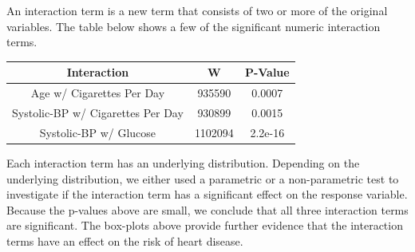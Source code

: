 \documentclass[10pt]{article}
\begin{document}
An interaction term is a new term that consists of two or more of the original variables. The table below shows a few of the significant numeric interaction terms.

\begin{table}[h!]
\centering
\begin{tabular}{| c | c | c | } 
\hline
Interaction & W & P-Value\\ 
\hline
\hline
Age w/ Cigarettes Per Day  &  935590  & 0.0007 \\
\hline
Systolic-BP w/ Cigarettes Per Day & 930899  & 0.0015 \\
\hline
Systolic-BP w/ Glucose  & 1102094  & 2.2e-16 \\
\hline  
\end{tabular}
\end{table}

\begin{figure}[hbt!]
\hspace*{\fill}
\centering
{}\hspace{2em}
\hspace*{\fill}
\end{figure}

Each interaction term has an underlying distribution. Depending on the underlying distribution, we either used a parametric or a non-parametric test to investigate if the interaction term has a significant effect on the response variable. Because the p-values above are small, we conclude that all three interaction terms are significant. The box-plots above provide further evidence that the interaction terms have an effect on the risk of heart disease.
\end{document}

